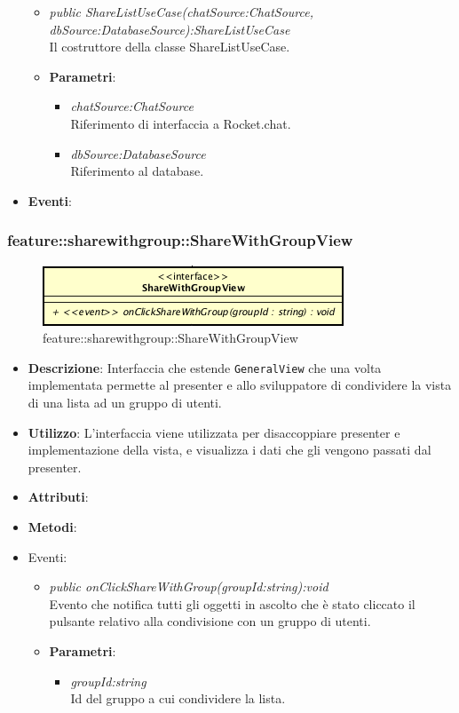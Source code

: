 \begin{itemize}
\begin{itemize}
\item \textit{public ShareListUseCase(chatSource:ChatSource, dbSource:DatabaseSource):ShareListUseCase}\\
	Il costruttore della classe ShareListUseCase.
	\item{\textbf{Parametri}: \begin{itemize}
	\item \textit{chatSource:ChatSource}\\
	 	Riferimento di interfaccia a Rocket.chat.
	\item \textit{dbSource:DatabaseSource}\\
		Riferimento al database.
	\end{itemize}}
\end{itemize}
\item \textbf{Eventi}:
\end{itemize}

\subsubsection{feature::sharewithgroup::ShareWithGroupView}

\label{feature::sharewithgroup::ShareWithGroupView}
\begin{figure}[ht]
	\centering
	\includegraphics[scale=0.5]{Sezioni/SottosezioniST/img/app/ShareWithGroupView.png}
	\caption{feature::sharewithgroup::ShareWithGroupView}
\end{figure}

\begin{itemize}
\item \textbf{Descrizione}: Interfaccia che estende \texttt{GeneralView} che una volta implementata permette al presenter e allo sviluppatore di condividere la vista di una lista ad un gruppo di utenti.
\item \textbf{Utilizzo}: L'interfaccia viene utilizzata per disaccoppiare presenter e implementazione della vista, e visualizza i dati che gli vengono passati dal presenter.
\item \textbf{Attributi}: 
\item \textbf{Metodi}:
\item{Eventi}:
	\begin{itemize}
	\item \textit{public onClickShareWithGroup(groupId:string):void}\\
	Evento che notifica tutti gli oggetti in ascolto che è stato cliccato il pulsante relativo alla condivisione con un gruppo di utenti.										
	\item{\textbf{Parametri}: \begin{itemize}
			\item \textit{groupId:string}\\
			Id del gruppo a cui condividere la lista.
			\end{itemize}}
	\end{itemize}
\end{itemize}

